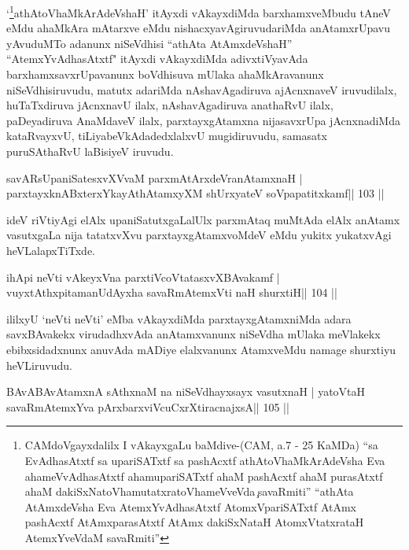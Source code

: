 \begin{artha}
`\footnote{CAMdoVgayxdalilx I vAkayxgaLu baMdive-(CAM, a.7 - 25  KaMDa) ``sa EvAdhasAtxtf sa upariSATxtf sa pashAcxtf athAtoV\s  haMkArAdeVsha Eva ahameVvAdhasAtxtf ahamupariSATxtf ahaM pashAcxtf ahaM purasAtxtf ahaM dakiSxNatoV\s hamutatxratoV\s hameVveVda\c\ savaRmiti'' ``athAta AtAmxdeVsha Eva AtemxYvAdhasAtxtf AtomxVpariSATxtf AtAmx pashAcxtf AtAmxparasAtxtf AtAmx dakiSxNataH AtomxVtatxrataH AtemxYveVdaM savaRmiti''}athAtoV\s haMkArAdeVshaH' itAyxdi vAkayxdiMda barxhamxveMbudu tAneV eMdu ahaMkAra mAtarxve eMdu nishacxyavAgiruvudariMda anAtamxrUpavu yAvuduMTo adanunx niSeVdhisi ``athAta AtAmxdeVshaH'' ``AtemxYvAdhasAtxtf" itAyxdi vAkayxdiMda adivxtiVyavAda barxhamxsavxrUpavanunx boVdhisuva mUlaka ahaMkAravanunx niSeVdhisiruvudu, matutx adariMda nAshavAgadiruva ajAcnxnaveV iruvudilalx, huTaTxdiruva jAcnxnavU ilalx, nAshavAgadiruva anathaRvU ilalx, paDeyadiruva AnaMdaveV ilalx, parxtayxgAtamxna nijasavxrUpa jAcnxnadiMda kataRvayxvU, tiLiyabeVkAdadedxlalxvU mugidiruvudu, samasatx puruSAthaRvU laBisiyeV iruvudu.
\end{artha}

\begin{shl}
savARsUpaniSatesxvXVvaM parxmAtArxdeVranAtamxnaH |
parxtayxknABxterxYkayAthAtamxyXM shUrxyateV soVpapatitxkamf\hfill || 103 ||
\end{shl}

\begin{artha}
ideV riVtiyAgi elAlx upaniSatutxgaLalUlx parxmAtaq muMtAda elAlx anAtamx
vasutxgaLa nija tatatxvXvu parxtayxgAtamxvoMdeV eMdu yukitx yukatxvAgi heVLalapxTiTxde.
\end{artha}

\begin{shl}
ihApi neVti vAkeyxVna parxtiVcoV\s tatasxvXBAvakamf |
vuyxtAthxpitamanUdAyx\s\s ha savaRmAtemxVti naH shurxtiH\hfill || 104 ||
\end{shl}

\begin{artha}
ililxyU `neVti neVti' eMba vAkayxdiMda parxtayxgAtamxniMda adara savxBAvakekx virudadhxvAda anAtamxvanunx niSeVdha mUlaka meVlakekx ebibxsidadxnunx anuvAda mADiye elalxvanunx AtamxveMdu namage shurxtiyu heVLiruvudu.
\end{artha}


\begin{shl}
BAvABAvAtamxnA sAthxnaM na niSeVdhayxsayx vasutxnaH |
yatoV\s taH savaRmAtemxYva pArxbarxviVcuCxrXtiracnajxsA\hfill || 105 ||
\end{shl}

